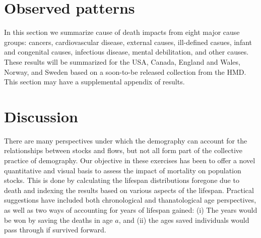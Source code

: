 \documentclass{article}
\begin{document}
\FloatBarrier

\section*{Observed patterns}
In this section we summarize cause of death impacts from eight
major cause groups: cancers, cardiovascular disease, external causes, ill-defined casues, infant and congenital causes, infectious disease, mental
debilitation, and other causes. These results will be summarized for the USA,
Canada, England and Wales, Norway, and Sweden based on a soon-to-be
released collection from the HMD. This section may have a supplemental appendix
of results.

\section*{Discussion}

There are many perspectives under which the demography can account for the
relationships between stocks and flows, but not all form part of the collective
practice of demography. 
Our objective in these exercises has been to offer a novel quantitative and
visual basis to assess the impact of mortality on population stocks.
This is done by calculating the lifespan distributions foregone due to death and indexing the results based on various aspects of the lifespan. Practical suggestions have included both chronological and thanatological age
perspectives, as well as two ways of accounting for years of lifespan gained:
(i) The years would be won by saving the deaths in age $a$, and (ii) the
ages saved individuals would pass through if survived forward.
\end{document}
